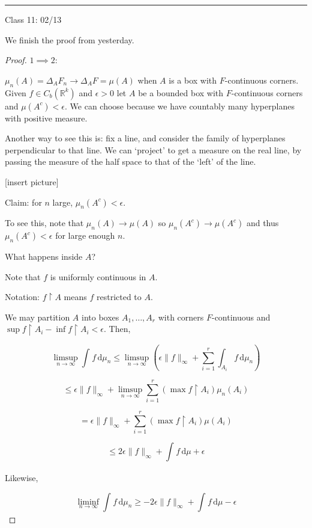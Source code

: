 \documentclass{article}
\theoremstyle{definition}
\begin{document}
\hfil
\hrule

Class 11: 02/13

We finish the proof from yesterday.

\begin{proof}
    \(1 \implies 2\):

    \(\mu_n(A) = \Delta _A F_n \to \Delta_A F = \mu(A)\) when \(A\) is a box with \(F\)-continuous corners. Given \(f\in C_b(\mathbb{R}^k)\) and \(\epsilon > 0\) let \(A\) be a bounded box with \(F\)-continuous corners and \(\mu(A^c) < \epsilon\).  We can choose because we have countably many hyperplanes with positive measure.

    Another way to see this is: fix a line, and consider the family of hyperplanes perpendicular to that line. We can `project' to get a measure on the real line, by passing the measure of the half space to that of the `left' of the line.

    [insert picture]

    Claim: for \(n\) large, \(\mu_n(A^c) < \epsilon\).

    To see this, note that \(\mu_n(A) \to \mu(A)\) so \(\mu_n(A^c)\to\mu(A^c)\) and thus \(\mu_n(A^c)<\epsilon\) for large enough \(n\).

    What happens inside \(A\)?

    Note that \(f\) is uniformly continuous in \(A\).

    Notation: \(f \upharpoonright A\) means \(f\) restricted to \(A\).

    We may partition \(A\) into boxes \(A_1, \dots , A_r\) with corners \(F\)-continuous and \(\sup f\upharpoonright A_i - \inf f\upharpoonright A_i < \epsilon\). Then,

    \[
        \limsup_{n \to \infty} \int_{}^{} f \,\mathrm{d}\mu_n \leq \limsup_{n \to \infty} \left( \epsilon \lVert f \rVert _\infty + \sum_{i=1}^{r} \int_{A_i}^{} f \,\mathrm{d}\mu_n  \right)
    \]
    
    \[
        \leq \epsilon \lVert f \rVert _\infty + \limsup_{n \to \infty} \sum_{i=1}^{r} (\max f\upharpoonright A_i)\mu_n(A_i)
    \]

    \[
        = \epsilon \lVert f \rVert _\infty + \sum_{i=1}^{r} (\max f\upharpoonright A_i)\mu(A_i)
    \]

    \[
        \leq 2 \epsilon \lVert f \rVert _\infty + \int_{}^{} f \,\mathrm{d}\mu + \epsilon 
    \]

    Likewise,

    \[
        \liminf_{n \to \infty} \int_{}^{} f \,\mathrm{d}\mu_n \geq - 2 \epsilon \lVert f \rVert _\infty + \int_{}^{} f \,\mathrm{d}\mu - \epsilon
    \]


\end{proof}
\end{document}
